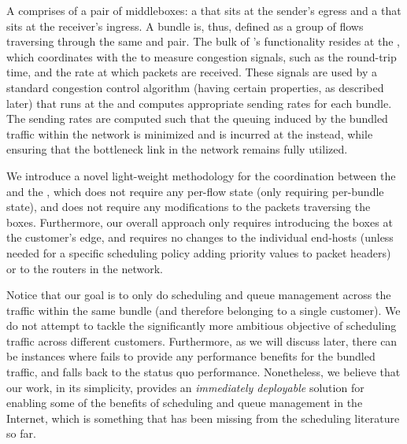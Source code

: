  A \name comprises of a pair of middleboxes: a \emph{\inbox} that sits at the sender's egress and a \emph{\outbox} that sits at the receiver's ingress. A bundle is, thus, defined as a group of flows traversing through the same \inbox and \outbox pair. The bulk of \name's functionality resides at the \inbox, which coordinates with the \outbox to measure congestion signals, such as the round-trip time, and the rate at which packets are received. These signals are used by a standard congestion control algorithm (having certain properties, as described later) that runs at the \inbox and computes appropriate sending rates for each bundle. The sending rates are computed such that the queuing induced by the bundled traffic within the network is minimized and is incurred at the \inbox instead, while ensuring that the bottleneck link in the network remains fully utilized. 
 
 We introduce a novel light-weight methodology for the coordination between the \inbox and the \outbox, which does not require any per-flow state (only requiring per-bundle state), and does not require any modifications to the packets traversing the \name boxes. Furthermore, our overall approach only requires introducing the \name boxes at the customer's edge, and requires no changes to the individual end-hosts (unless needed for a specific scheduling policy \eg adding priority values to packet headers) or to the routers in the network. 
 
 Notice that our goal is to only do scheduling and queue management across the traffic within the same bundle (and therefore belonging to a single customer). We do not attempt to tackle the significantly more ambitious objective of scheduling traffic across different customers. Furthermore, as we will discuss later, there can be instances where \name fails to provide any performance benefits for the bundled traffic, and falls back to the status quo performance. Nonetheless, we believe that our work, in its simplicity, provides an \emph{immediately deployable} solution for enabling some of the benefits of scheduling and queue management in the Internet, which is something that has been missing from the scheduling literature so far. 


